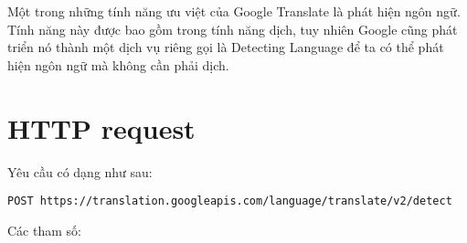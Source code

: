 \documentclass[../thesis.tex]{subfiles}
\begin{document}
Một trong những tính năng ưu việt của Google Translate là phát hiện ngôn ngữ. Tính năng này được bao gồm trong tính năng dịch, tuy nhiên Google cũng phát triển nó thành một dịch vụ riêng gọi là Detecting Language để ta có thể phát hiện ngôn ngữ mà không cần phải dịch.

\section{HTTP request}
Yêu cầu có dạng như sau:
\begin{lstlisting}[numbers=none, frame=single,xleftmargin=0.15cm,xrightmargin=0.15cm]
POST https://translation.googleapis.com/language/translate/v2/detect
\end{lstlisting}

Các tham số:
\end{document}
